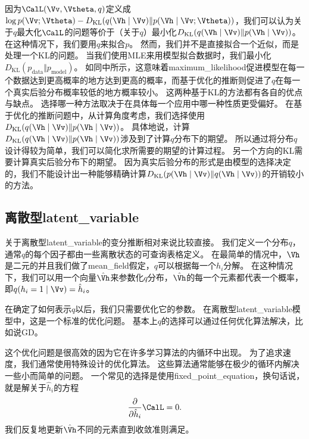 因为$\CalL(\Vv,\Vtheta,q)$定义成$\log p(\Vv;\Vtheta) - D_{\text{KL}} (q(\Vh\mid\Vv) \Vert  p(\Vh\mid\Vv;\Vtheta) )$，我们可以认为关于$q$最大化$\CalL$的问题等价于（关于$q$）最小化$D_{\text{KL}}(q(\Vh\mid\Vv)\Vert p(\Vh\mid\Vv))$。
在这种情况下，我们要用$q$来拟合$p$。
然而，我们并不是直接拟合一个近似，而是处理一个\gls{KL}的问题。
当我们使用\gls{MLE}来用模型拟合数据时，我们最小化$D_{\text{KL}}(p_{\text{data}} \Vert p_{\text{model}})$。
如同中所示，这意味着\gls{maximum_likelihood}促进模型在每一个数据达到更高概率的地方达到更高的概率，而基于优化的推断则促进了$q$在每一个真实后验分布概率较低的地方概率较小。
这两种基于\gls{KL}的方法都有各自的优点与缺点。
选择哪一种方法取决于在具体每一个应用中哪一种性质更受偏好。
在基于优化的推断问题中，从计算角度考虑，我们选择使用$D_{\text{KL}}(q(\Vh\mid\Vv)\Vert p(\Vh\mid\Vv))$。
具体地说，计算$D_{\text{KL}}(q(\Vh\mid\Vv)\Vert p(\Vh\mid\Vv))$涉及到了计算$q$分布下的期望。
所以通过将分布$q$设计得较为简单，我们可以简化求所需要的期望的计算过程。
另一个方向的\gls{KL}需要计算真实后验分布下的期望。
因为真实后验分布的形式是由模型的选择决定的，我们不能设计出一种能够精确计算$D_{\text{KL}}(p(\Vh\mid\Vv) \Vert q(\Vh\mid\Vv))$的开销较小的方法。




\subsection{离散型\gls{latent_variable}}
\label{sec:discrete_latent_variables}

关于离散型\gls{latent_variable}的变分推断相对来说比较直接。
我们定义一个分布$q$，通常$q$的每个因子都由一些离散状态的可查询表格定义。
在最简单的情况中，$\Vh$是二元的并且我们做了\gls{mean_field}假定，$q$可以根据每一个$h_i$分解。
在这种情况下，我们可以用一个向量$\hat{\Vh}$来参数化$q$分布，$\hat{\Vh}$的每一个元素都代表一个概率，即$q(h_i = 1\mid \Vv) = \hat{h}_i$。


在确定了如何表示$q$以后，我们只需要优化它的参数。
在离散型\gls{latent_variable}模型中，这是一个标准的优化问题。
基本上$q$的选择可以通过任何优化算法解决，比如说\gls{GD}。


这个优化问题是很高效的因为它在许多学习算法的内循环中出现。
为了追求速度，我们通常使用特殊设计的优化算法。
这些算法通常能够在极少的循环内解决一些小而简单的问题。
一个常见的选择是使用\gls{fixed_point_equation}，换句话说，就是解关于$\hat{h}_i$的方程
\begin{align}
	\frac{\partial}{\partial \hat{h}_i}\CalL = 0.
\end{align}
我们反复地更新$\hat{\Vh}$不同的元素直到收敛准则满足。


